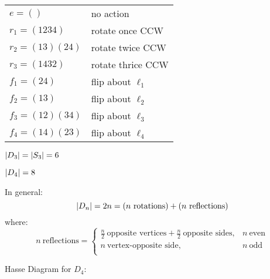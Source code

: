 \documentclass[letterpaper,12pt,fleqn]{article}
\begin{document}
\begin{example}[$D_4$]
  \begin{minipage}{3in}
  \end{minipage}
  \begin{minipage}{3in}
    \begin{tabular}{ll}
      $e=()$ & no action \\
      $r_1=(1234)$ & rotate once CCW \\
      $r_2=(13)(24)$ & rotate twice CCW \\
      $r_3=(1432)$ & rotate thrice CCW \\
      $f_1=(24)$ & flip about $\ell_1$ \\
      $f_2=(13)$ & flip about $\ell_2$ \\
      $f_3=(12)(34)$ & flip about $\ell_3$ \\
      $f_4=(14)(23)$ & flip about $\ell_4$ \\
    \end{tabular}
  \end{minipage}
\end{example}
\newpage
$\lvert D_3\rvert=\lvert S_3\rvert=6$

$\lvert D_4\rvert=8$

In general:
\[\abs{D_n}=2n=(n\ \mbox{rotations})+(n\ \mbox{reflections})\]
where:
\[n\ \mbox{reflections}=\begin{cases}
\frac{n}{2}\ \mbox{opposite vertices}+\frac{n}{2}\ \mbox{opposite sides}, &
n\ \mbox{even} \\
n\ \mbox{vertex-opposite side}, & n\ \mbox{odd} \\
\end{cases}\]

Hasse Diagram for $D_4$:
\end{document}
